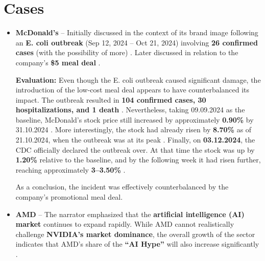 \documentclass[12pt,a4paper]{article}
\begin{document}
\section{Cases}
\begin{itemize}
    \item \textbf{McDonald's} -- Initially discussed in the context of its brand image following an \textbf{E. coli outbreak} (Sep 12, 2024 – Oct 21, 2024) involving \textbf{26 confirmed cases} (with the possibility of more) \cite{wikipedia}. Later discussed in relation to the company’s \textbf{\$5 meal deal} \cite{cnbc}. 
\vspace{0.3cm}

\textbf{Evaluation:} Even though the E. coli outbreak caused significant damage, 
the introduction of the low-cost meal deal appears to have counterbalanced its impact. 
The outbreak resulted in \textbf{104 confirmed cases, 30 hospitalizations, and 1 death} \cite{wikipedia}. 
Nevertheless, taking 09.09.2024 as the baseline, McDonald’s stock price still increased by approximately \textbf{0.90\%} by 31.10.2024 \cite{MCD}. 
More interestingly, the stock had already risen by \textbf{8.70\%} as of 21.10.2024, when the outbreak was at its peak \cite{MCD}. 
Finally, on \textbf{03.12.2024}, the CDC officially declared the outbreak over. 
At that time the stock was up by \textbf{1.20\%} relative to the baseline, and by the following week it had risen further, reaching approximately \textbf{3--3.50\%} \cite{MCD}.

As a conclusion, the incident was effectively counterbalanced by the company’s promotional meal deal.
\vspace{0.7cm}



    \item \textbf{AMD} -- The narrator emphasized that the \textbf{artificial intelligence (AI) market} continues to expand rapidly. 
    While AMD cannot realistically challenge \textbf{NVIDIA’s market dominance}, 
    the overall growth of the sector indicates that AMD’s share of the \textbf{“AI Hype”} will also increase significantly \cite{cnbc}.
\vspace{0.3cm}


\end{itemize}
\end{document}
